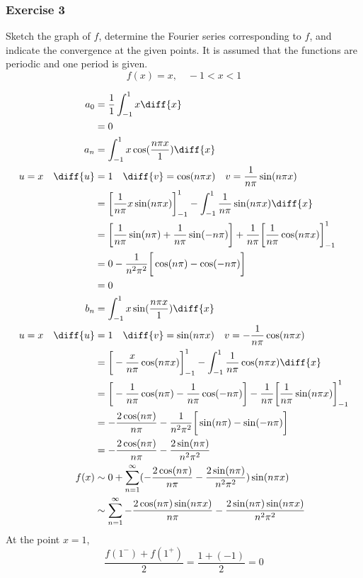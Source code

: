 \documentclass{math}
\begin{document}
\subsubsection*{Exercise 3}
Sketch the graph of \( f \), determine the Fourier series corresponding to
\( f \), and indicate the convergence at the given points. It is assumed that
the functions are periodic and one period is given.
\[ f(x) = x, \quad -1<x<1 \]
\begin{center}
\end{center}
\begin{align*}
  a_0 &= \frac{1}{1}\int_{-1}^{1}x\diff{x} \\
  &= 0 \\
  a_n &= \int_{-1}^{1}x\cos(\frac{n\pi x}{1})\diff{x} \\
  u = x \quad \diff{u} &= 1 \quad \diff{v} = \cos(n\pi x) \quad
    v = \frac{1}{n\pi}\sin(n\pi x) \\
  &= \bigg[\frac{1}{n\pi}x\sin(n\pi x)\bigg]_{-1}^{1}-
    \int_{-1}^{1}\frac{1}{n\pi}\sin(n\pi x)\diff{x} \\
  &= \bigg[\frac{1}{n\pi}\sin(n\pi)+\frac{1}{n\pi}\sin(-n\pi)\bigg]+
    \frac{1}{n\pi}\bigg[\frac{1}{n\pi}\cos(n\pi x)\bigg]_{-1}^{1} \\
  &= 0-\frac{1}{n^2\pi^2}\bigg[\cos(n\pi)-\cos(-n\pi)\bigg] \\
  &= 0 \\
  b_n &= \int_{-1}^{1}x\sin(\frac{n\pi x}{1})\diff{x} \\
  u = x \quad \diff{u} &= 1 \quad \diff{v} = \sin(n\pi x) \quad
    v = -\frac{1}{n\pi}\cos(n\pi x) \\
  &= \bigg[-\frac{x}{n\pi}\cos(n\pi x)\bigg]_{-1}^{1}-
    \int_{-1}^{1}\frac{1}{n\pi}\cos(n\pi x)\diff{x} \\
  &= \bigg[-\frac{1}{n\pi}\cos(n\pi)-\frac{1}{n\pi}\cos(-n\pi)\bigg]-
    \frac{1}{n\pi}\bigg[\frac{1}{n\pi}\sin(n\pi x)\bigg]_{-1}^{1} \\
  &= -\frac{2\cos(n\pi)}{n\pi}-
    \frac{1}{n^2\pi^2}\bigg[\sin(n\pi)-\sin(-n\pi)\bigg] \\
  &= -\frac{2\cos(n\pi)}{n\pi}-\frac{2\sin(n\pi)}{n^2\pi^2} \\
  f(x) &\sim 0+\sum_{n=1}^{\infty}(-\frac{2\cos(n\pi)}{n\pi}-
    \frac{2\sin(n\pi)}{n^2\pi^2})\sin(n\pi x) \\
  &\sim \sum_{n=1}^{\infty}-\frac{2\cos(n\pi)\sin(n\pi x)}{n\pi}-
    \frac{2\sin(n\pi)\sin(n\pi x)}{n^2\pi^2}
\end{align*}
At the point \( x = 1 \),
\[ \frac{f(1^-)+f(1^+)}{2} = \frac{1+(-1)}{2} = 0 \]
\end{document}
